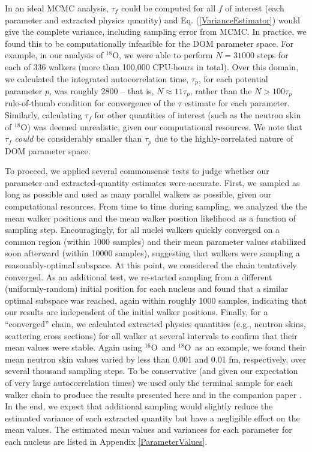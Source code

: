 \documentclass[twocolumn,secnumarabic,amssymb, nobibnotes, aps, prl,
superscriptaddress, nobalancelastpage]{revtex4}
\newcommand{\oSix}{\ensuremath{^{16}}O}
\newcommand{\oEight}{\ensuremath{^{18}}O}
\begin{document}
In an ideal MCMC analysis, $\tau_{f}$ could be computed for all $f$ of
interest (each parameter and extracted physics quantity) and Eq.
(\ref{VarianceEstimator}) would give the complete variance, including sampling
error from MCMC. In practice, we found this to be computationally infeasible
for the DOM parameter space. For example, in our analysis of \oEight, we were
able to perform $N=31000$ steps for each of 336 walkers (more than 100,000
CPU-hours in total). Over this domain, we calculated the
integrated autocorrelation time, $\tau_{p}$, for each potential parameter $p$,
was roughly 2800 -- that is, $N \approx 11\tau_{p}$, rather than the
$N > 100\tau_{p}$ rule-of-thumb condition for convergence of the $\tau$ estimate
for each parameter. Similarly, calculating $\tau_{f}$ for other quantities
of interest (such as the neutron skin of \oEight) was deemed unrealistic, given
our computational resources. We note that $\tau_{f}$ \textit{could} be considerably
smaller than $\tau_{p}$ due to the highly-correlated nature of DOM parameter space.

To proceed, we applied several commonsense tests to
judge whether our parameter and extracted-quantity estimates were accurate.
First, we sampled as long as possible and used as many parallel walkers as
possible, given our computational resources. From time to time during sampling,
we analyzed the the mean walker positions and the mean walker position likelihood
as a function of sampling step. Encouragingly, for all nuclei walkers quickly
converged on a common region (within 1000 samples) and their mean parameter
values stabilized soon afterward (within 10000 samples), suggesting that walkers
were sampling a reasonably-optimal subspace. At this point, we considered the chain
tentatively converged. As an additional test, we re-started sampling from a different
(uniformly-random) initial position for each nucleus and found that a similar
optimal subspace was reached, again within roughly 1000 samples, indicating that
our results are independent of the initial walker positions. Finally, for a
``converged'' chain, we calculated extracted physics quantities (e.g., neutron
skins, scattering cross sections) for all walker at several intervals
to confirm that their mean values were stable. Again using \oSix\ and \oEight\ as
an example, we found their mean neutron skin values varied by less
than 0.001 and 0.01 fm, respectively, over several thousand sampling steps.
To be conservative (and given our expectation of very large autocorrelation times)
we used only the terminal sample for each walker chain to produce
the results presented here and in the companion paper \cite{Pruitt2020PRL}.
In the end, we expect that additional sampling would slightly
reduce the estimated variance of each extracted quantity but have a negligible
effect on the mean values. The estimated mean values and variances for each
parameter for each nucleus are listed in Appendix \ref{ParameterValues}.
\end{document}
